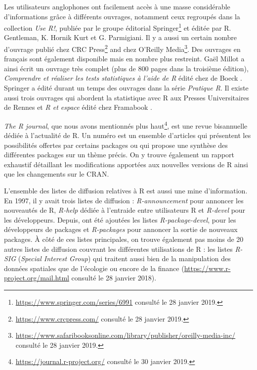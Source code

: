\documentclass[]{article}
\begin{document}
Les utilisateurs anglophones ont facilement accès à une masse considérable d'informations grâce à différents ouvrages, notamment ceux regroupés dans la collection \emph{Use R!}, publiée par le groupe éditorial Springer\footnote{\url{https://www.springer.com/series/6991} consulté le 28 janvier 2019.} et éditée par R. Gentleman, K. Hornik Kurt et G. Parmigiani. Il y a aussi un certain nombre d'ouvrage publié chez CRC Press\footnote{\url{https://www.crcpress.com/} consulté le 28 janvier 2019.} and chez O'Reilly Media\footnote{\url{https://www.safaribooksonline.com/library/publisher/oreilly-media-inc/} consulté le 28 janvier 2019.}. Des ouvrages en français sont également disponible mais en nombre plus restreint. Gaël Millot a ainsi écrit un ouvrage très complet (plus de 800 pages dans la troisième édition), \emph{Comprendre et réaliser les tests statistiques à l'aide de R} édité chez de Boeck \citep{millot_comprendre_2018}. Springer a édité durant un temps des ouvrages dans la série \emph{Pratique R}. Il existe aussi trois ouvrages qui abordent la statistique avec R aux Presses Universitaires de Rennes et \emph{R et espace} édité chez Framabook \citep{groupe_elementr_r_2014}.

\emph{The R journal}, que nous avons mentionnés plus haut\footnote{\url{https://journal.r-project.org/} consulté le 30 janvier 2019.}, est une revue bisannuelle dédiée à l'actualité de R. Un numéro est un ensemble d'articles qui présentent les possibilités offertes par certains packages ou qui propose une synthèse des différentes packages sur un thème précis. On y trouve également un rapport exhaustif détaillant les modifications apportées aux nouvelles versions de R ainsi que les changements sur le CRAN.

L'ensemble des listes de diffusion relatives à R est aussi une mine d'information. En 1997, il y avait trois listes de diffusion : \emph{R-announcement} pour annoncer les nouveautés de R, \emph{R-help} dédiée à l'entraide entre utilisateurs R et \emph{R-devel} pour les développeurs. Depuis, ont été ajoutées les listes \emph{R-package-devel}, pour les développeurs de packages et \emph{R-packages} pour annoncer la sortie de nouveaux packages. À côté de ces listes principales, on trouve également pas moins de 20 autres listes de diffusion couvrant les différentes utilisations de R : les listes \emph{R-SIG} (\emph{Special Interest Group}) qui traitent aussi bien de la manipulation des données spatiales que de l'écologie ou encore de la finance (\url{https://www.r-project.org/mail.html} consulté le 28 janvier 2018).
\end{document}
